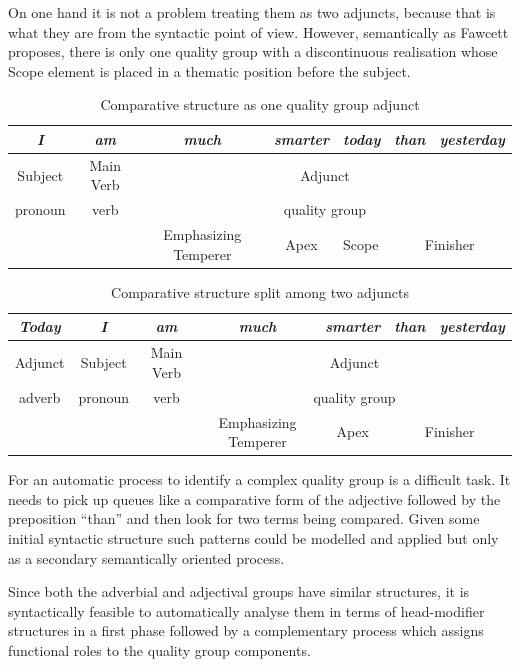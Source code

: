 	On one hand it is not a problem treating them as two adjuncts, because that is what they are from the syntactic point of view. However, semantically as Fawcett proposes, there is only one quality group with a discontinuous realisation whose Scope element is placed in a thematic position before the subject. 
	\begin{table}[h]
		\centering
		\begin{tabular}{|c|c|c|c|l|c|c|}
			\hline
			\textit{I} & \textit{am} & \textit{much} & \textit{smarter} & \textit{today} & \textit{than} & \textit{yesterday} \\ \hline
			Subject & Main Verb & \multicolumn{5}{c|}{Adjunct} \\ \hline
			pronoun & verb & \multicolumn{5}{c|}{quality group} \\ \hline
			&  & Emphasizing Temperer & Apex & Scope & \multicolumn{2}{c|}{Finisher} \\ \hline
		\end{tabular}
		\caption{Comparative structure as one quality group adjunct}
		\label{tab:csgq1}
	\end{table}
	\begin{table}[h]
		\centering
		\begin{tabular}{|c|c|c|c|c|c|c|}
			\hline
			\textit{Today} & \textit{I} & \textit{am} & \textit{much} & \textit{smarter} & \textit{than} & \textit{yesterday} \\ \hline
			Adjunct & Subject & Main Verb & \multicolumn{4}{c|}{Adjunct} \\ \hline
			adverb & pronoun & verb & \multicolumn{4}{c|}{quality group} \\ \hline
			&  &  & Emphasizing Temperer & Apex & \multicolumn{2}{c|}{Finisher} \\ \hline
		\end{tabular}
		\caption{Comparative structure split among two adjuncts}
		\label{tab:csgq2}
	\end{table}
	For an automatic process to identify a complex quality group is a difficult task. It needs to pick up queues like a comparative form of the adjective followed by the preposition ``than'' and then look for two terms being compared. Given some initial syntactic structure such patterns could be modelled and applied but only as a secondary semantically oriented process.
	
	Since both the adverbial and adjectival groups have similar structures, it is syntactically feasible to automatically analyse them in terms of head-modifier structures in a first phase followed by a complementary process which assigns functional roles to the quality group components. 

